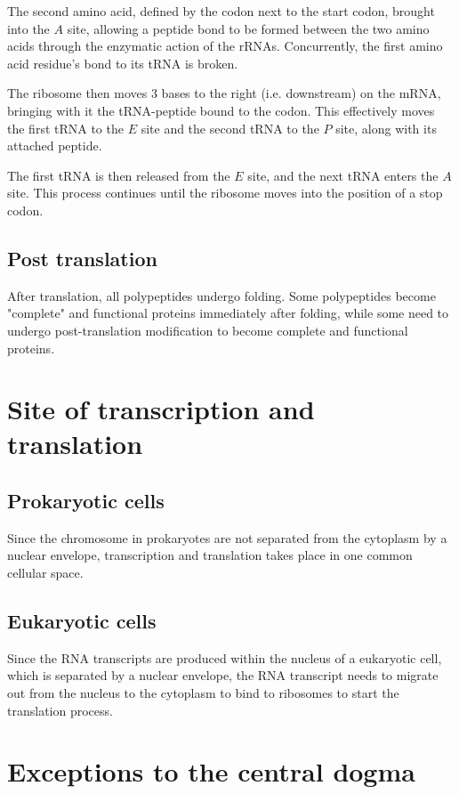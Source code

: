 \documentclass[11pt]{article}
\begin{document}
The second amino acid, defined by the codon next to the start codon, brought into the \(A\) site, allowing a peptide bond to be formed between the two amino acids through the enzymatic action of the rRNAs. Concurrently, the first amino acid residue's bond to its tRNA is broken.


The ribosome then moves 3 bases to the right (i.e. downstream) on the mRNA, bringing with it the tRNA-peptide bound to the codon. This effectively moves the first tRNA to the \(E\) site and the second tRNA to the \(P\) site, along with its attached peptide.


The first tRNA is then released from the \(E\) site, and the next tRNA enters the \(A\) site. This process continues until the ribosome moves into the position of a stop codon.
\subsection{Post translation}
\label{sec:orge96d138}
After translation, all polypeptides undergo folding. Some polypeptides become "complete" and functional proteins immediately after folding, while some need to undergo post-translation modification to become complete and functional proteins.
\section{Site of transcription and translation}
\label{sec:org00640de}

\subsection{Prokaryotic cells}
\label{sec:org0821aac}
Since the chromosome in prokaryotes are not separated from the cytoplasm by a nuclear envelope, transcription and translation takes place in one common cellular space.
\subsection{Eukaryotic cells}
\label{sec:org0f6bf90}
Since the RNA transcripts are produced within the nucleus of a eukaryotic cell, which is separated by a nuclear envelope, the RNA transcript needs to migrate out from the nucleus to the cytoplasm to bind to ribosomes to start the translation process.

\newpage
\section{Exceptions to the central dogma}
\label{sec:orgbeae209}
\end{document}
